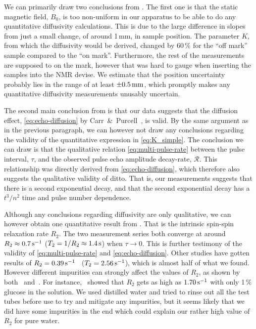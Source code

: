 \documentclass[11pt,a4paper, twocolumn,
swedish, english %
]{article}
\begin{document}
We can primarily draw two conclusions from . The
first one is that the static magnetic field, $B_0$, is too non-uniform
in our apparatus to be able to do any quantitative diffusivity
calculations. This is due to the large difference in slopes from just
a small change, of around 1\,mm, in sample position. The parameter
$K$, from which the diffusivity would be derived, changed by 60\,\%
for the ``off mark'' sample compared to the ``on mark''. Furthermore,
the rest of the measurements are supposed to on the mark, however that
was hard to gauge when inserting the samples into the NMR devise. We
estimate that the position uncertainty probably lies in the range of
at least $\pm\unit[0.5]{mm}$, which promptly makes any quantitative
diffusivity measurements unusably uncertain.

The second main conclusion from  is that our
data suggests that the diffusion effect, \eqref{eq:echo-diffusion} by
Carr~\&~Purcell~\cite{Carr-Purcell1954}, is valid. By the same
argument as in the previous paragraph, we can however not draw any
conclusions regarding the validity of the quantitative expression in
\eqref{eq:K_simple}. The conclusion we can draw is that the
qualitative relation \eqref{eq:multi-pulse-rate} between the pulse
interval, $\tau$, and the observed pulse echo amplitude decay-rate,
$\mathcal{R}$. This relationship was directly derived from
\eqref{eq:echo-diffusion}, which therefore also suggests the
qualitative validity of ditto. That is, our measurements suggests that
there is a second exponential decay, and that the second exponential
decay has a $t^3/n^2$ time and pulse number dependence. 

Although any conclusions regarding diffusivity are only
qualitative, we can however obtain one quantitative result from
. That is the intrinsic spin-spin relaxation
rate $R_2$. The two measurement series both converge at around
$R_2\approx\unit[0.7]{s^{-1}}$ ($T_2=1/R_2\approx\unit[1.4]{s}$) when
$\tau\to0$. This is further testimony 
of the validity of \eqref{eq:multi-pulse-rate} and
\eqref{eq:echo-diffusion}. Other studies have gotten results of
$R_2=\unit[0.39]{s^{-1}}$~\cite{Sabadini-etal2008}
($T_2=\unit[2.56]{s^{-1}}$), which is almost half of what we
found. However different impurities can strongly affect the values of
$R_2$, as shown by both~\cite{Sabadini-etal2008}
and~\cite{Nelson-etal2002}. For instance,~\cite{Sabadini-etal2008}
showed that $R_2$ gets as high as $\unit[1.70]{s^{-1}}$ with only
1\,\% glucose in the solution. We used distilled water and tried to
rinse out all the test tubes before use to try and mitigate any
impurities, but it seems likely that we did have some impurities in
the end which could explain our rather high value of $R_2$ for pure
water. 
\end{document}
